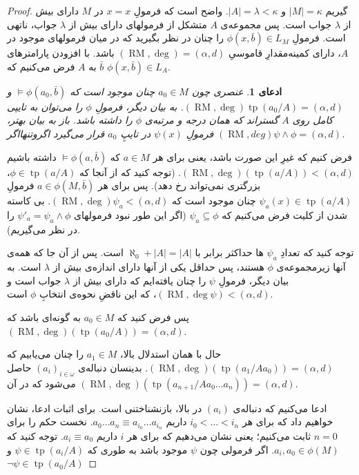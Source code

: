 \documentclass[12pt,a4paper]{report}
\theoremstyle{colorhead}
\newtheorem{claim}[thm]{ادعای}
\DeclareMathOperator{\RM}{RM}
\DeclareMathOperator{\tp}{tp}
\begin{document}
\begin{proof}
گیریم
$|M|=\kappa$
و
$|A|=\lambda<\kappa$.
واضح است که فرمولِ
$x=x$
در
$M$
دارای بیش از
$\lambda$
جواب است.
پس مجموعه‌ی
$A$
متشکل از فرمولهای دارای بیش از 
$\lambda$
جواب، ناتهی است. 
 فرمولِ
$\phi(x,\bar{b})\in L_M$
را چنان در نظر بگیرید که 
در میان فرمولهای
موجود در
$A$،
 دارای کمینه‌مقدارِ قاموسیِ
$(\RM,\deg)=(\alpha,d)$
باشد. با افزودن پارامترهای
$\bar{b}$
به 
$A$
فرض می‌کنیم که 
$\phi(x,\bar{b})\in L_A$.
\begin{claim}
عنصری چون
$a_0\in M$
چنان موجود است که 
$\models \phi(a_0,\bar{b})$
و
\mbox{$(\RM,\deg)\tp(a_0/A)=(\alpha,d)$}.
به بیان دیگر، فرمولِ
$\phi$
را می‌توان به تایپی کامل روی
$A$
گستراند که همان درجه‌ و مرتبه‌ی 
$\phi$
را داشته باشد. باز به بیان بهتر،‌
فرمولِ
$\psi(x)$
در تایپِ
$a_0$
قرار می‌گیرد اگروتنهااگر
$(\RM,deg)\psi\wedge\phi=(\alpha,d)$.
\end{claim}
فرض کنیم که غیرِ این صورت باشد، یعنی برای هر
$a\in M$
که
$\models \phi(a,\bar{b})$
داشته باشیم
$(\RM,\deg)(\tp(a/A))<(\alpha,d)$.
(توجه کنید که از آنجا که
$\phi\in \tp(a/A)$،
بزرگتری نمی‌تواند رخ دهد).
پس برای هر
$a\in \phi(M,\bar{b})$
فرمولِ
$\psi_a(x)\in \tp(a/A)$
چنان موجود است که 
\mbox{$(\RM,\deg)\psi_a<(\alpha,d)$}.
بی‌ کاسته شدن از کلیت فرض می‌کنیم
که 
$\psi_a\subseteq \phi$
(اگر این طور نبود فرمولهای
$\psi'_a=\psi_a\wedge\phi$
را در نظر می‌گیریم).
\par 
توجه کنید که تعدادِ
$\psi_a$
ها حداکثر برابر با
$\aleph_0+|A|=|A|$
است.
پس از آن جا که همه‌ی آنها زیرمجموعه‌ی
$\phi$
هستند، پس حداقل یکی از آنها دارای اندازه‌ی بیش
از
$\lambda$
است. 
به بیان دیگر، فرمولِ
$\psi$
را چنان یافته‌ایم که
دارای بیش از
$\lambda$
جواب است و 
\mbox{$(\RM,\deg \psi)<(\alpha,d)$}، 
که این ناقضِ
نحوه‌ی انتخابِ
$\phi$
است.
\par 
 پس فرض کنید که 
$a_0\in M$
به گونه‌ای باشد که
$(\RM,\deg)(\tp(a_0/A))=(\alpha,d)$.
\par 
حال با همان استدلال بالا، 
$a_1\in M$
را چنان می‌یابیم که 
$(\RM,\deg )(\tp(a_1/Aa_0))=(\alpha,d)$.
بدینسان دنباله‌ی
$(a_i)_{i\in \omega}$
حاصل می‌شود که در آن
$(\RM,\deg)(\tp(a_{n+1}/Aa_0\ldots a_n))=(\alpha,d)$.
\par 
ادعا می‌کنیم که دنباله‌ی
$(a_i)$
در بالا، بازنشناختنی است. برای اثبات ادعا، نشان خواهیم داد که برای هر
$i_0<\ldots <i_n$
داریم
$a_0\ldots a_n\equiv a_{i_0}\ldots a_{i_n}$.
نخست حکم را برای 
\mbox{$n=0$}
ثابت می‌کنیم؛ یعنی نشان می‌دهیم که برای هر
$i$
داریم
$a_i\equiv a_0$.
توجه کنید که
$a_i,a_0\in \phi(M)$.
اگر فرمولی چون
$\psi$
موجود باشد به طوری که
$\psi\in \tp(a_i/A)$
و
$\neg \psi\in \tp(a_0/A)$

\end{proof}
\end{document}
